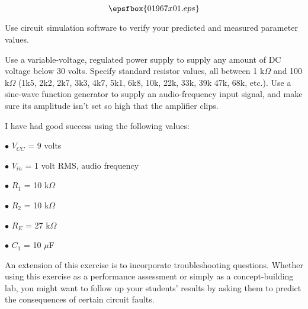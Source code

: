 

$$\epsfbox{01967x01.eps}$$

\vfil \eject






Use circuit simulation software to verify your predicted and measured parameter values.







Use a variable-voltage, regulated power supply to supply any amount of DC voltage below 30 volts.  Specify standard resistor values, all between 1 k$\Omega$ and 100 k$\Omega$ (1k5, 2k2, 2k7, 3k3, 4k7, 5k1, 6k8, 10k, 22k, 33k, 39k 47k, 68k, etc.).  Use a sine-wave function generator to supply an audio-frequency input signal, and make sure its amplitude isn't set so high that the amplifier clips.

I have had good success using the following values:

\medskip
\item{$\bullet$} $V_{CC}$ = 9 volts
\item{$\bullet$} $V_{in}$ = 1 volt RMS, audio frequency
\item{$\bullet$} $R_1$ = 10 k$\Omega$
\item{$\bullet$} $R_2$ = 10 k$\Omega$
\item{$\bullet$} $R_E$ = 27 k$\Omega$
\item{$\bullet$} $C_1$ = 10 $\mu$F
\medskip

An extension of this exercise is to incorporate troubleshooting questions.  Whether using this exercise as a performance assessment or simply as a concept-building lab, you might want to follow up your students' results by asking them to predict the consequences of certain circuit faults.




